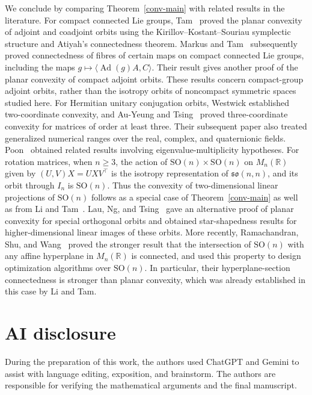 \documentclass[11pt,reqno]{amsart}
\theoremstyle{remark}
\newcommand{\R}{\mathbb R}
\begin{document}
We conclude by comparing Theorem~\ref{conv-main} with related results
in the literature. For compact connected Lie groups, Tam~\cite{Tam2002}
proved the planar convexity of adjoint and coadjoint orbits using the
Kirillov--Kostant--Souriau symplectic structure and Atiyah's connectedness
theorem. Markus and Tam~\cite{MarkusTam2011} subsequently proved
connectedness of fibres of certain maps on compact connected Lie
groups, including the maps $g\mapsto\langle\operatorname{Ad}(g)A,C\rangle$.
Their result gives another proof of the planar convexity of compact
adjoint orbits. These results concern compact-group adjoint orbits,
rather than the isotropy orbits of noncompact symmetric spaces studied
here. For Hermitian unitary conjugation orbits, Westwick
\cite{Westwick1975} established two-coordinate convexity, and Au-Yeung
and Tsing~\cite{AuYeungTsing1983} proved three-coordinate convexity
for matrices of order at least three. Their subsequent paper
\cite{AuYeungTsing1984} also treated generalized numerical ranges
over the real, complex, and quaternionic fields. Poon~\cite{Poon1997}
obtained related results involving eigenvalue-multiplicity hypotheses.
For rotation matrices,
when $n\ge3$, the action of
$\mathrm{SO}(n)\times\mathrm{SO}(n)$ on $M_n(\R)$ given by
$(U,V)X=UXV^{\top}$ is the isotropy representation of
$\mathfrak{so}(n,n)$, and its orbit through $I_n$ is $\mathrm{SO}(n)$.
Thus the convexity of two-dimensional linear projections of
$\mathrm{SO}(n)$ follows as a special case of Theorem~\ref{conv-main}
as well as from Li and Tam~\cite[Theorem~11.7, page~168]{LiTam2000}.
Lau, Ng, and Tsing~\cite{LauNgTsing2016} gave an alternative proof of
planar convexity for special orthogonal orbits and obtained
star-shapedness results for higher-dimensional linear images of these
orbits. More recently, Ramachandran, Shu, and Wang~\cite{RSW2025}
proved the stronger
result that the intersection of $\mathrm{SO}(n)$ with any affine
hyperplane in $M_n(\R)$ is connected, and used this property to design optimization algorithms over
$\mathrm{SO}(n)$. In particular, their hyperplane-section connectedness
is stronger than planar convexity, which was already established in
this case by Li and Tam.

\section*{AI disclosure}
During the preparation of this work, the authors used ChatGPT and Gemini to assist with language editing, exposition, and brainstorm. The authors are responsible for verifying the mathematical arguments and the final manuscript.
\end{document}
